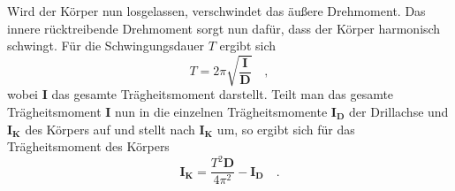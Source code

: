 Wird der Körper nun losgelassen, verschwindet das äußere Drehmoment. Das innere
rücktreibende Drehmoment sorgt nun dafür, dass der Körper harmonisch schwingt.
Für die Schwingungsdauer $T$ ergibt sich
\begin{equation}
  T=2\pi\sqrt{\frac{\symbf{I}}{\symbf{D}}}\quad,
  \label{eqn:schwingung}
\end{equation}
wobei $\symbf{I}$ das gesamte Trägheitsmoment darstellt. Teilt man das gesamte Trägheitsmoment
$\symbf{I}$ nun in die einzelnen Trägheitsmomente $\symbf{I_D}$ der Drillachse und
$\symbf{I_K}$ des Körpers auf und stellt nach $\symbf{I_K}$ um, so ergibt sich für
das Trägheitsmoment des Körpers
\begin{equation}
  \symbf{I_K}=\frac{T^2 \symbf{D}}{4\pi^2}-\symbf{I_D}\quad.
  \label{eqn:traegheitschwingung}
\end{equation}
